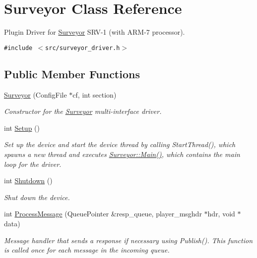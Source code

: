 \hypertarget{classSurveyor}{
\section{Surveyor Class Reference}
\label{classSurveyor}
}
Plugin Driver for \hyperlink{classSurveyor}{Surveyor} SRV-1 (with ARM-7 processor).  


{\tt \#include $<$src/surveyor\_\-driver.h$>$}

\subsection*{Public Member Functions}
\begin{CompactItemize}
\item 
\hyperlink{classSurveyor_b0792137ec4760d15de63856ebeb7464}{Surveyor} (ConfigFile $\ast$cf, int section)
\begin{CompactList}\small\item\em Constructor for the \hyperlink{classSurveyor}{Surveyor} multi-interface driver. \item\end{CompactList}\item 
int \hyperlink{classSurveyor_c127d6028c08790fe79902b1b8359468}{Setup} ()
\begin{CompactList}\small\item\em Set up the device and start the device thread by calling StartThread(), which spawns a new thread and executes \hyperlink{classSurveyor_e6ae9ea8d60a2038b6dacdab7ccee458}{Surveyor::Main()}, which contains the main loop for the driver. \item\end{CompactList}\item 
int \hyperlink{classSurveyor_cfe0180d05f0a34474a75cdfd87b1a81}{Shutdown} ()
\begin{CompactList}\small\item\em Shut down the device. \item\end{CompactList}\item 
int \hyperlink{classSurveyor_9af107b9b363d15951303c3cbaf4328f}{ProcessMessage} (QueuePointer \&resp\_\-queue, player\_\-msghdr $\ast$hdr, void $\ast$data)
\begin{CompactList}\small\item\em Message handler that sends a response if necessary using Publish(). This function is called once for each message in the incoming queue. \item\end{CompactList}\end{CompactItemize}
